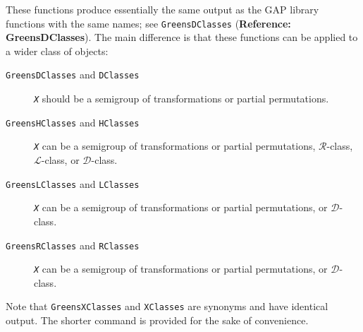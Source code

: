 \documentclass[a4paper,11pt]{report}
\begin{document}
{{{ These functions produce essentially the same output as the \textsf{GAP} library functions with the same names; see \texttt{GreensDClasses} (\textbf{Reference: GreensDClasses}). The main difference is that these functions can be applied to a wider class
of objects: 
\begin{description}
\item[{\texttt{GreensDClasses} and \texttt{DClasses}}]  \mbox{\texttt{\mdseries\slshape X}} should be a semigroup of transformations or partial permutations. 
\item[{\texttt{GreensHClasses} and \texttt{HClasses}}]  \mbox{\texttt{\mdseries\slshape X}} can be a semigroup of transformations or partial permutations, $\mathcal{R}$-class, $\mathcal{L}$-class, or $\mathcal{D}$-class. 
\item[{\texttt{GreensLClasses} and \texttt{LClasses}}]  \mbox{\texttt{\mdseries\slshape X}} can be a semigroup of transformations or partial permutations, or $\mathcal{D}$-class. 
\item[{\texttt{GreensRClasses} and \texttt{RClasses}}]  \mbox{\texttt{\mdseries\slshape X}} can be a semigroup of transformations or partial permutations, or $\mathcal{D}$-class. 
\end{description}
 Note that \texttt{GreensXClasses} and \texttt{XClasses} are synonyms and have identical output. The shorter command is provided for
the sake of convenience.

}}}
\end{document}
